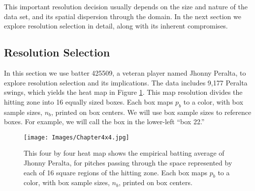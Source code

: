 This important resolution decision usually depends on the size and nature of the data set, and its spatial dispersion through the domain. In the next section we explore resolution selection in detail, along with its inherent compromises.

\subsection{Resolution Selection}

In this section we use batter 425509, a veteran player named Jhonny Peralta, to explore resolution selection and its implications. The data includes 9,177 Peralta swings, which yields the heat map in Figure \ref{fig:4x4}. This map resolution divides the hitting zone into 16 equally sized boxes. Each box maps $p_{b}$ to a color, with box sample sizes, $n_{b}$, printed on box centers. We will use box sample sizes to reference boxes. For example, we will call the box in the lower-left ``box 22.'' 
        \begin{figure}[H]
      	\centering
      	\texttt{[image: Images/Chapter4x4.jpg]} 
      	\caption{This four by four heat map shows the empirical batting average of Jhonny Peralta, for pitches passing through the space represented by each of 16 square regions of the hitting zone. Each box maps $p_{b}$ to a color, with box sample sizes, $n_{b}$, printed on box centers.}
      	\label{fig:4x4}
      	\end{figure} 


